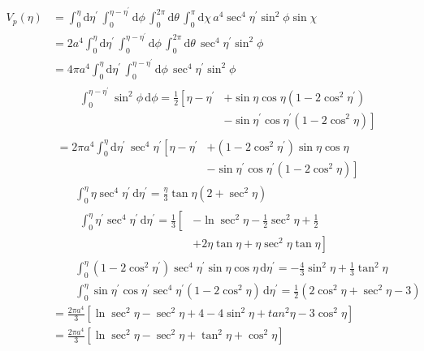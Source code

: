 \documentclass[12pt]{article}
\begin{document}
\begin{align}
V_p\left(\eta\right) &= \int_0^\eta \! \mathrm d\eta^\prime \, \int_0^{\eta-\eta^\prime} \! \mathrm d\phi \, \int_0^{2\pi}\!\mathrm d\theta\, \int_0^\pi\!\mathrm d\chi\, a^4\sec^4\eta^\prime\sin^2\phi\sin\chi \\
  &= 2a^4\int_0^\eta\!\mathrm d\eta^\prime\, \int_0^{\eta-\eta^\prime}\!\mathrm d\phi\, \int_0^{2\pi}\!\mathrm d\theta\, \sec^4\eta^\prime\sin^2\phi \\
  &= 4\pi a^4 \int_0^\eta\!\mathrm d\eta^\prime\,\int_0^{\eta-\eta^\prime}\!\mathrm d\phi\, \sec^4\eta^\prime\sin^2\phi \\
  &\qquad\begin{aligned}
    \int_0^{\eta-\eta^\prime}\!\sin^2\phi\,\mathrm d\phi = \frac{1}{2}\left[\eta-\eta^\prime\right.&\left.+\sin\eta\cos\eta\left(1-2\cos^2\eta^\prime\right)\right. \\
    &\left.-\sin\eta^\prime\cos\eta^\prime\left(1-2\cos^2\eta\right)\right]
  \end{aligned} \\
  &\begin{aligned}
    = 2\pi a^4\int_0^\eta\!\mathrm d\eta^\prime\,\sec^4\eta^\prime\left[\eta-\eta^\prime\right.&\left.+\left(1-2\cos^2\eta^\prime\right)\sin\eta\cos\eta\right. \\
    &\left.-\sin\eta^\prime\cos\eta^\prime\left(1-2\cos^2\eta\right)\right]
  \end{aligned} \\
  &\qquad\int_0^\eta\!\eta\sec^4\eta^\prime\,\mathrm d\eta^\prime = \frac{\eta}{3}\tan\eta\left(2+\sec^2\eta\right) \\
  &\qquad\begin{aligned}
    \int_0^\eta\!\eta^\prime\sec^4\eta^\prime\,\mathrm d\eta^\prime = \frac{1}{3}\left[\right.&\left.-\ln\sec^2\eta-\frac{1}{2}\sec^2\eta + \frac{1}{2}\right. \\
    &\left.+2\eta\tan\eta+\eta\sec^2\eta\tan\eta\right]
  \end{aligned} \\
  &\qquad\int_0^\eta\!\left(1-2\cos^2\eta^\prime\right)\sec^4\eta^\prime\sin\eta\cos\eta\,\mathrm d\eta^\prime = -\frac{4}{3}\sin^2\eta+\frac{1}{3}\tan^2\eta \\
  &\qquad\int_0^\eta\!\sin\eta^\prime\cos\eta^\prime\sec^4\eta^\prime\left(1-2\cos^2\eta\right)\,\mathrm d\eta^\prime = \frac{1}{2}\left(2\cos^2\eta+\sec^2\eta-3\right) \\
  &= \frac{2\pi a^4}{3}\left[\ln\sec^2\eta-\sec^2\eta+4-4\sin^2\eta+tan^2\eta-3\cos^2\eta\right] \\
  &= \frac{2\pi a^4}{3}\left[\ln\sec^2\eta-\sec^2\eta+\tan^2\eta+\cos^2\eta\right]
\end{align}
\end{document}

